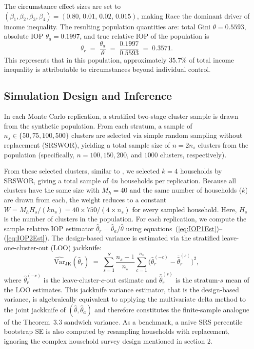 \documentclass[12pt]{article}
\theoremstyle{plain}
\theoremstyle{definition}
\begin{document}
The circumstance effect sizes are set to $(\beta_1, \beta_2, \beta_3, \beta_4)
= (0.80,\, 0.01,\, 0.02,\, 0.015)$, making Race the dominant driver of
income inequality. The resulting population quantities are: total Gini
$\theta = 0.5593$, absolute IOP $\theta_a = 0.1997$, and true relative IOP of the population is
\begin{equation}
    \theta_r \;=\; \frac{\theta_a}{\theta} \;=\; \frac{0.1997}{0.5593}
              \;=\; 0.3571.
    \label{eq:true_omega_r}
\end{equation}
This represents that in this population, approximately $35.7\%$ of total income inequality is attributable to circumstances beyond individual control.
\subsection{Simulation Design and Inference}
In each Monte Carlo replication, a stratified two-stage cluster sample is drawn from the synthetic population. From each stratum, a sample of $n_s \in \{50, 75, 100, 500\}$ clusters are selected via simple random sampling without replacement (SRSWOR), yielding a total sample size of $n = 2n_s$ clusters from the population (specifically, $n = 100, 150, 200$, and $1000$ clusters, respectively).

From these selected clusters, similar to \cite{Bhattacharya2007}, we selected $k =4$ households by SRSWOR, giving a total sample of $4n$ households per replication. Because all clusters have the same size with $M_h = 40$ and the same number of households ($k$) are drawn from each, the weight reduces to a constant $W = M_h H_s/(k n_s) = 40 \times 750 / (4 \times n_s)$ for
every sampled household. Here, $H_s$ is the number of clusters in the population. For each replication, we compute the sample relative IOP estimator $\hat{\theta}_r = \hat{\theta}_a / \hat{\theta}$
using equations~(\ref{eq:IOP1Est})--(\ref{eq:IOP2Est}). The design-based variance is estimated via the stratified leave-one-cluster-out (LOO) jackknife:
\begin{equation}
    \widehat{\mathrm{Var}}_{\mathrm{JK}}(\hat{\theta}_r)
    \;=\;
    \sum_{s=1}^{S} \frac{n_s - 1}{n_s}
    \sum_{c=1}^{n_s}
    \bigl(\hat{\theta}_r^{(-c)} - \bar{\hat{\theta}}_r^{(s)}\bigr)^2,
    \label{eq:jk_var}
\end{equation}
where $\hat{\theta}_r^{(-c)}$ is the leave-cluster-$c$-out estimate and
$\bar{\hat{\theta}}_r^{(s)}$ is the stratum-$s$ mean of the LOO estimates. This jackknife variance estimator, that is the design-based variance, is algebraically equivalent to applying the multivariate delta method to the joint jackknife of $(\hat{\theta}, \hat{\theta}_a)$
and therefore constitutes the finite-sample analogue of the Theorem~3.3 sandwich variance. As a benchmark, a naive SRS percentile bootstrap SE is also computed by resampling households with replacement, ignoring the complex household survey 
design mentioned in section 2.
\end{document}
